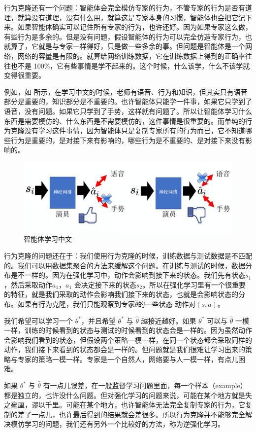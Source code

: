 行为克隆还有一个问题：智能体会完全模仿专家的行为，不管专家的行为是否有道理，就算没有道理，没有什么用，就算这是专家本身的习惯，智能体也会把它记下来。如果智能体确实可以记住所有专家的行为，也许还好。因为如果专家这么做，有些行为是多余的。但是没有问题，假设智能体的行为可以完全仿造专家行为，也就算了，它就是与专家一样得好，只是做一些多余的事。但问题是智能体是一个网络，网络的容量是有限的。就算给网络训练数据，它在训练数据上得到的正确率往往也不是 100\%，它有些事情是学不起来的。这个时候，什么该学，什么不该学就变得很重要。

例如，如 所示，在学习中文的时候，老师有语音、行为和知识，但其实只有语音部分是重要的，知识部分是不重要的。也许智能体只能学一件事，如果它只学到了语音，没有问题。如果它只学到了手势，这样就有问题了。所以让智能体学习什么东西是需要模仿的、什么东西是不需要模仿的，这件事情是很重要的。而单纯的行为克隆没有学习这件事情，因为智能体只是复制专家所有的行为而已，它不知道哪些行为是重要的，是对接下来有影响的，哪些行为是不重要的、是对接下来没有影响的。

\begin{figure}[htb]
   \centering
   \includegraphics[width=0.5\linewidth]{res/ch11/11.5}
   \caption{智能体学习中文}
   \label{fig:fig11.5}
\end{figure}


行为克隆的问题还在于：我们使用行为克隆的时候，训练数据与测试数据是不匹配的。我们可以用数据集聚合的方法来缓解这个问题。在训练与测试的时候，数据分布是不一样的。因为在强化学习中，动作会影响到接下来的状态。我们先有状态$s_1$，然后采取动作$a_1$，$a_1$ 会决定接下来的状态$s_2$。所以在强化学习里有一个很重要的特征，就是我们采取的动作会影响我们接下来的状态，也就是会影响状态的分布。如果有行为克隆，我们只能观察到专家$\hat{\theta}$的一些状态-动作对$(s,a)$。

我们希望可以学习一个 $\theta^*$，并且希望 $\theta^*$ 与 $\hat{\theta}$ 越接近越好。如果 $\theta^*$ 可以与 $\hat{\theta}$ 一模一样，训练的时候看到的状态与测试的时候看到的状态会是一样的。因为虽然动作会影响我们看到的状态，但假设两个策略一模一样，在同一个状态都会采取同样的动作，我们接下来看到的状态都会是一样的。但问题就是我们很难让学习出来的策略与专家的策略一模一样。专家是一个自然人，网络要与人一模一样，有点儿困难。

如果 $\theta^*$ 与 $\hat{\theta}$ 有一点儿误差，在一般监督学习问题里面，每一个样本（example）都是独立的，也许没什么问题。但对强化学习的问题来说，可能在某个地方就是失之毫厘，谬以千里。可能在某个地方，也许智能体无法完全复制专家的行为，它复制的差了一点儿，也许最后得到的结果就会差很多。所以行为克隆并不能够完全解决模仿学习的问题，我们还有另外一个比较好的方法，称为逆强化学习。

